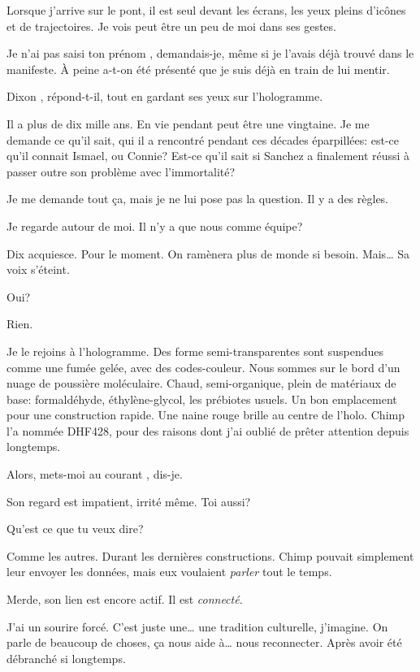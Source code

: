 Lorsque j'arrive sur le pont, il est seul devant les écrans, les yeux pleins d'icônes et de trajectoires. Je vois peut être un peu de moi dans ses gestes.

\og Je n'ai pas saisi ton prénom \fg , demandais-je, même si je l'avais déjà trouvé dans le manifeste. À peine a-t-on été présenté que je suis déjà en train de lui mentir.

\og Dixon \fg, répond-t-il, tout en gardant ses yeux sur l'hologramme.

Il a plus de dix mille ans. En vie pendant peut être une vingtaine. Je me demande ce qu'il sait, qui il a rencontré pendant ces décades éparpillées: est-ce qu'il connait Ismael, ou Connie? Est-ce qu'il sait si Sanchez a finalement réussi à passer outre son problème avec l'immortalité?

Je me demande tout ça, mais je ne lui pose pas la question. Il y a des règles.

Je regarde autour de moi. \og Il n’y a que nous comme équipe?\fg

Dix acquiesce. \og Pour le moment. On ramènera plus de monde si besoin. Mais\ldots\fg{} Sa voix s'éteint.

\og Oui? \fg

\og Rien. \fg

Je le rejoins à l'hologramme. Des forme semi-transparentes sont suspendues comme une fumée gelée, avec des codes-couleur. Nous sommes sur le bord d'un nuage de poussière mo\-lé\-cu\-laire. Chaud, semi-or\-ga\-nique, plein de ma\-té\-riaux de base: for\-mal\-dé\-hyde, éthylène-glycol, les pré\-biotes usu\-els. Un bon emplacement pour une construction rapide. Une naine rouge brille au centre de l'holo. Chimp l'a nommée DHF428, pour des raisons dont j'ai oublié de prêter attention depuis longtemps.

\og Alors, mets-moi au courant \fg , dis-je.

Son regard est impatient, irrité même. \og Toi aussi? \fg

\og Qu'est ce que tu veux dire? \fg

\og Comme les autres. Durant les dernières constructions. Chimp pouvait simplement leur envoyer les données, mais eux voulaient \emph{parler} tout le temps.\fg

Merde, son lien est encore actif. Il est \emph{connecté}.

J'ai un sourire forcé. \og C'est juste une\ldots{} une tradition culturelle, j'imagine. On parle de beaucoup de choses, ça nous aide à\ldots{} nous reconnecter. Après avoir été débranché si longtemps.\fg{}

